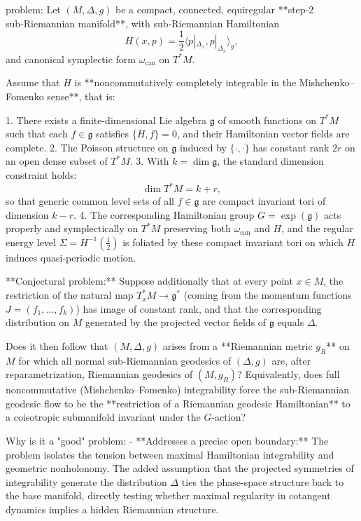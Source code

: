 problem:  
Let \((M,\Delta,g)\) be a compact, connected, equiregular **step‑2 sub‑Riemannian manifold**, with sub‑Riemannian Hamiltonian  
\[
H(x,p)=\frac12\langle p|_{\Delta_x},p|_{\Delta_x}\rangle_g,
\]
and canonical symplectic form \(\omega_{\mathrm{can}}\) on \(T^*M\).  

Assume that \(H\) is **noncommutatively completely integrable in the Mishchenko–Fomenko sense**, that is:  

1. There exists a finite-dimensional Lie algebra \(\mathfrak g\) of smooth functions on \(T^*M\) such that each \(f\in \mathfrak g\) satisfies \(\{H,f\}=0\), and their Hamiltonian vector fields are complete.  
2. The Poisson structure on \(\mathfrak g\) induced by \(\{\cdot,\cdot\}\) has constant rank \(2r\) on an open dense subset of \(T^*M\).  
3. With \(k=\dim \mathfrak g\), the standard dimension constraint holds:
   \[
   \dim T^*M = k+r,
   \]
   so that generic common level sets of all \(f\in\mathfrak g\) are compact invariant tori of dimension \(k-r\).  
4. The corresponding Hamiltonian group \(G=\exp(\mathfrak g)\) acts properly and symplectically on \(T^*M\) preserving both \(\omega_{\mathrm{can}}\) and \(H\), and the regular energy level \(\Sigma=H^{-1}(\tfrac12)\) is foliated by these compact invariant tori on which \(H\) induces quasi‑periodic motion.  

**Conjectural problem:**  
Suppose additionally that at every point \(x\in M\), the restriction of the natural map \(T_x^*M\to \mathfrak g^*\) (coming from the momentum functions \(J=(f_1,\dots,f_k)\)) has image of constant rank, and that the corresponding distribution on \(M\) generated by the projected vector fields of \(\mathfrak g\) equals \(\Delta\).  

Does it then follow that \((M,\Delta,g)\) arises from a **Riemannian metric \(g_R\)** on \(M\) for which all normal sub‑Riemannian geodesics of \((\Delta,g)\) are, after reparametrization, Riemannian geodesics of \((M,g_R)\)?  
Equivalently, does full noncommutative (Mishchenko–Fomenko) integrability force the sub‑Riemannian geodesic flow to be the **restriction of a Riemannian geodesic Hamiltonian** to a coisotropic submanifold invariant under the \(G\)-action?  

Why is it a "good" problem:  
- **Addresses a precise open boundary:** The problem isolates the tension between maximal Hamiltonian integrability and geometric nonholonomy. The added assumption that the projected symmetries of integrability generate the distribution \(\Delta\) ties the phase‑space structure back to the base manifold, directly testing whether maximal regularity in cotangent dynamics implies a hidden Riemannian structure.  


